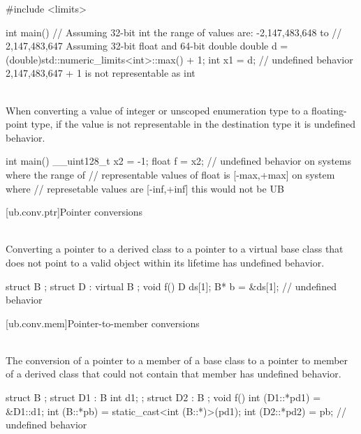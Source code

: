 \pnum
\begin{example}
\begin{codeblock}
#include <limits>

int main() {
  // Assuming 32-bit int the range of values are: -2,147,483,648 to
  // 2,147,483,647 Assuming 32-bit float and 64-bit double
  double d = (double)std::numeric_limits<int>::max() + 1;
  int x1 = d;   // undefined behavior 2,147,483,647 + 1 is not representable as int
}
\end{codeblock}
\end{example}

\pnum
{} \\
When converting a value of integer or unscoped enumeration type to a
floating-point type, if the value is not representable in the destination type
it is undefined behavior.

\pnum
\begin{example}
\begin{codeblock}
    int main() {
      __uint128_t x2 = -1;
      float f = x2; // undefined behavior on systems where the range of
      // representable values of float is [-max,+max] on system where
      // represetable values are [-inf,+inf] this would not be UB
    }
\end{codeblock}
\end{example}

[ub.conv.ptr]{Pointer conversions}

\pnum
{} \\
Converting
a pointer to a derived class 
to
a pointer to a virtual base class 
that does not point to
a valid object
within its lifetime
has undefined behavior.

\pnum
\begin{example}
\begin{codeblock}
struct B {};
struct D : virtual B {};
void f()
{
  D ds[1];
  B* b = &ds[1];    // undefined behavior
}
\end{codeblock}
\end{example}

[ub.conv.mem]{Pointer-to-member conversions}

\pnum
{} \\
The conversion of
a pointer to a member of a base class
to a pointer to member of a derived class
that could not contain that member
has undefined behavior.

\pnum
\begin{example}
\begin{codeblock}
struct B {};
struct D1 : B { int d1; };
struct D2 : B {};
void f()
{
  int (D1::*pd1) = &D1::d1;
  int (B::*pb) = static_cast<int (B::*)>(pd1);
  int (D2::*pd2) = pb;  // undefined behavior
}
\end{codeblock}
\end{example}




